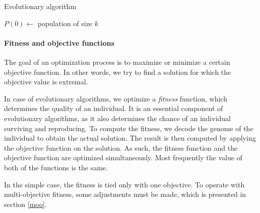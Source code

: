 \begin{algorithm}
\DontPrintSemicolon 
\caption{Evolutionary algorithm\label{alg:EA}}
  \SetNoFillComment
  \;
  $P(0) \longleftarrow$ population of size $k$ \label{EA:init}

  \;
\end{algorithm}

\paragraph{Fitness and objective functions}
The goal of an optimization process is to maximize or minimize a certain
objective function. In other words, we try to find a solution for which the
objective value is extremal.

In case of evolutionary algorithms, we optimize a \emph{fitness} function,
which determines the quality of an individual. It is an essential component of
evolutionary algorithms, as it also determines the chance of an individual
surviving and reproducing. To compute the fitness, we decode the genome of
the individual to obtain the actual solution. The result is then computed by
applying the objective function on the solution. As such, the fitness function
and the objective function are optimized simultaneously. Most frequently the
value of both of the functions is the same.

In the simple case, the fitness is tied only with one objective. To operate
with multi-objective fitness, some adjustments must be made, which is presented
in section \ref{moo}.


